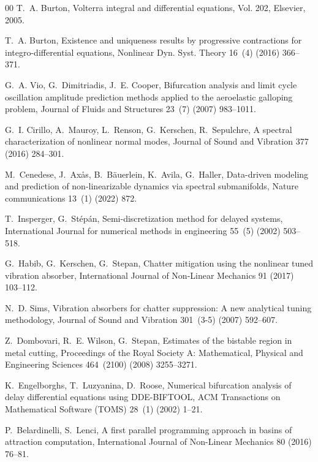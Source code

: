 \documentclass[preprint,12pt]{elsarticle}
\begin{document}
\begin{thebibliography}{00}
		T.~A. Burton, Volterra integral and differential equations, Vol. 202, Elsevier,
		2005.
		
		T.~A. Burton, Existence and uniqueness results by progressive contractions for
		integro-differential equations, Nonlinear Dyn. Syst. Theory 16~(4) (2016)
		366--371.
		
		G.~A. Vio, G.~Dimitriadis, J.~E. Cooper, Bifurcation analysis and limit cycle
		oscillation amplitude prediction methods applied to the aeroelastic galloping
		problem, Journal of Fluids and Structures 23~(7) (2007) 983--1011.
		
		G.~I. Cirillo, A.~Mauroy, L.~Renson, G.~Kerschen, R.~Sepulchre, A spectral
		characterization of nonlinear normal modes, Journal of Sound and Vibration
		377 (2016) 284--301.
		
		M.~Cenedese, J.~Ax{\aa}s, B.~B{\"a}uerlein, K.~Avila, G.~Haller, Data-driven
		modeling and prediction of non-linearizable dynamics via spectral
		submanifolds, Nature communications 13~(1) (2022) 872.
		
		T.~Insperger, G.~St{\'e}p{\'a}n, Semi-discretization method for delayed
		systems, International Journal for numerical methods in engineering 55~(5)
		(2002) 503--518.
		
		G.~Habib, G.~Kerschen, G.~Stepan, Chatter mitigation using the nonlinear tuned
		vibration absorber, International Journal of Non-Linear Mechanics 91 (2017)
		103--112.
		
		N.~D. Sims, Vibration absorbers for chatter suppression: A new analytical
		tuning methodology, Journal of Sound and Vibration 301~(3-5) (2007) 592--607.
		
		Z.~Dombovari, R.~E. Wilson, G.~Stepan, Estimates of the bistable region in
		metal cutting, Proceedings of the Royal Society A: Mathematical, Physical and
		Engineering Sciences 464~(2100) (2008) 3255--3271.
		
		K.~Engelborghs, T.~Luzyanina, D.~Roose, Numerical bifurcation analysis of delay
		differential equations using {DDE-BIFTOOL}, ACM Transactions on Mathematical
		Software (TOMS) 28~(1) (2002) 1--21.
		
		P.~Belardinelli, S.~Lenci, A first parallel programming approach in basins of
		attraction computation, International Journal of Non-Linear Mechanics 80
		(2016) 76--81.
		

\end{thebibliography}
\end{document}
